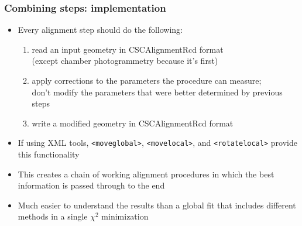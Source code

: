 \documentclass[compress]{beamer}
\begin{document}
\begin{frame}
\frametitle{Combining steps: implementation}
\begin{itemize}\setlength{\itemsep}{0.35 cm}
\item Every alignment step should do the following:
\begin{enumerate}\setlength{\itemsep}{0.2 cm}
\item read an input geometry in CSCAlignmentRcd format \\ (except chamber photogrammetry because it's first)
\item apply corrections to the parameters the procedure can \mbox{measure;\hspace{-1 cm}} \\ don't modify the parameters that were better determined by previous steps
\item write a modified geometry in CSCAlignmentRcd format
\end{enumerate}

\item If using XML tools, {\tt <moveglobal>}, {\tt <movelocal>}, and
  {\tt <rotatelocal>} provide this functionality

\item This creates a chain of working alignment procedures in which the
  best information is passed through to the end

\item Much easier to understand the results than a global fit that
  includes different methods in a single $\chi^2$ minimization
\end{itemize}
\end{frame}
\end{document}
